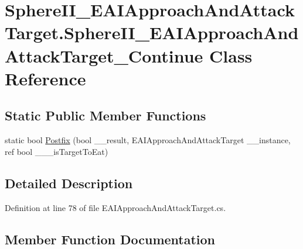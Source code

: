 \hypertarget{class_sphere_i_i___e_a_i_approach_and_attack_target_1_1_sphere_i_i___e_a_i_approach_and_attack_target___continue}{}\section{Sphere\+I\+I\+\_\+\+E\+A\+I\+Approach\+And\+Attack\+Target.\+Sphere\+I\+I\+\_\+\+E\+A\+I\+Approach\+And\+Attack\+Target\+\_\+\+Continue Class Reference}
\label{class_sphere_i_i___e_a_i_approach_and_attack_target_1_1_sphere_i_i___e_a_i_approach_and_attack_target___continue}
\subsection*{Static Public Member Functions}
\begin{DoxyCompactItemize}
\item 
static bool \mbox{\hyperlink{class_sphere_i_i___e_a_i_approach_and_attack_target_1_1_sphere_i_i___e_a_i_approach_and_attack_target___continue_af248b792be0e7b44141890956e062e8e}{Postfix}} (bool \+\_\+\+\_\+result, E\+A\+I\+Approach\+And\+Attack\+Target \+\_\+\+\_\+instance, ref bool \+\_\+\+\_\+\+\_\+is\+Target\+To\+Eat)
\end{DoxyCompactItemize}


\subsection{Detailed Description}


Definition at line 78 of file E\+A\+I\+Approach\+And\+Attack\+Target.\+cs.



\subsection{Member Function Documentation}
\mbox{\label{class_sphere_i_i___e_a_i_approach_and_attack_target_1_1_sphere_i_i___e_a_i_approach_and_attack_target___continue_af248b792be0e7b44141890956e062e8e}} 
